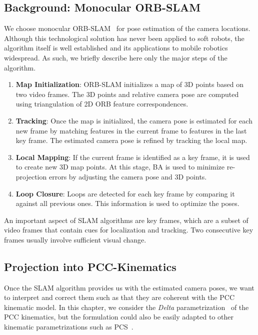 \subsection{Background: Monocular ORB-SLAM}
We choose monocular ORB-SLAM~\cite{mur2017orb} for pose estimation of the camera locations. Although this technological solution has never been applied to soft robots, the algorithm itself is well established and its applications to mobile robotics widespread. As such, we  briefly describe here only the major steps of the algorithm.%
 \begin{enumerate}
     \item \textbf{Map Initialization}: ORB-SLAM initializes a map of 3D points based on two video frames. The 3D points and relative camera pose are computed using triangulation of 2D ORB feature correspondences.
     \item \textbf{Tracking}: Once the map is initialized, the camera pose is estimated for each new frame by matching features in the current frame to features in the last key frame. The estimated camera pose is refined by tracking the local map.
     \item \textbf{Local Mapping}: If the current frame is identified as a key frame, it is used to create new 3D map points. At this stage, \gls{BA} is used to minimize re-projection errors by adjusting the camera pose and 3D points.
     \item \textbf{Loop Closure}: Loops are detected for each key frame by comparing it against all previous ones. %
     This information is used to optimize the poses.
 \end{enumerate}
An important aspect of \gls{SLAM} algorithms are key frames, which are a subset of video frames that contain cues for localization and tracking. Two consecutive key frames usually involve sufficient visual change. %

\subsection{Projection into PCC-Kinematics}
Once the \gls{SLAM} algorithm provides us with the estimated camera poses, we want to interpret and correct them such as that they are coherent with the \gls{PCC} kinematic model.
%
In this chapter, we consider the \emph{Delta} parametrization~\cite{della2020improved} of the \gls{PCC} kinematics, but the formulation could also be easily adapted to other kinematic parametrizations such as \gls{PCS}~\cite{renda2018discrete}.

